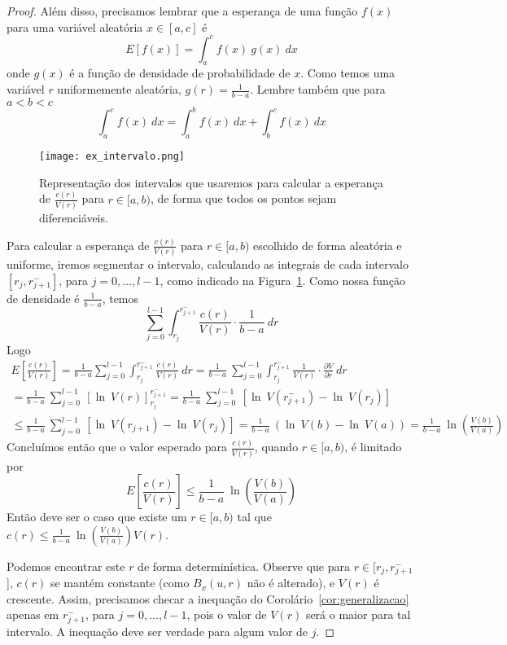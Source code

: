 \documentclass[12pt, a4paper]{article}
\begin{document}
\begin{proof}
Além disso, precisamos lembrar que a esperança de uma função $f(x)$ para uma variável aleatória $x \in [a, c]$ é
\[
    E[f(x)] = \int_a^c f(x)\ g(x)\ dx
\]
onde $g(x)$ é a função de densidade de probabilidade de $x$. Como temos uma variável $r$ uniformemente aleatória, $g(r) = \frac{1}{b - a}$.
Lembre também que para $a < b < c$
\[
    \int_a^c f(x)\ dx = \int_a^b f(x)\ dx + \int_b^c f(x)\ dx
\]

\begin{figure}[!htb]
\centering
\texttt{[image: ex\_intervalo.png]}
\caption{Representação dos intervalos que usaremos para calcular a esperança de $\frac{c(r)}{V(r)}$ para $r \in [a, b)$, de forma que todos os pontos sejam diferenciáveis.}
\label{fig:ex_intervalo}
\end{figure}

Para calcular a esperança de $\frac{c(r)}{V(r)}$ para $r \in [a, b)$ escolhido de forma aleatória e uniforme, iremos segmentar o intervalo, calculando as integrais de cada intervalo $[r_j, r_{j+1}^-]$, para $j = 0, \dots, l-1$, como indicado na Figura~\ref{fig:ex_intervalo}.
Como nossa função de densidade é $\frac{1}{b - a}$, temos
\[
    \sum_{j = 0}^{l-1} \int_{r_j}^{r_{j+1}^-} \frac{c(r)}{V(r)} \cdot \frac{1}{b-a}\ dr
\]
Logo
\begin{gather*}
    E\left[ \frac{c(r)}{V(r)} \right]
    = \frac{1}{b - a} \sum_{j = 0}^{l-1} \int_{r_j}^{r_{j+1}^-} \frac{c(r)}{V(r)}\ dr
    = \frac{1}{b - a}\ \sum_{j = 0}^{l-1} \int_{r_j}^{r_{j+1}^-} \frac{1}{V(r)} \cdot \frac{\partial V}{\partial r}\ dr\\
    = \frac{1}{b - a}\ \sum_{j = 0}^{l-1}\ [\ln\ V(r)]_{r_j}^{r_{j+1}^-}
    = \frac{1}{b - a}\ \sum_{j = 0}^{l-1}\ [\ln\ V(r_{j+1}^-) - \ln\ V(r_j)]\\
    \leq \frac{1}{b - a}\ \sum_{j = 0}^{l-1}\ [\ln\ V(r_{j+1}) - \ln\ V(r_j)]
    = \frac{1}{b - a}\ (\ln\ V(b) - \ln\ V(a))
    = \frac{1}{b - a}\ \ln\left(\frac{V(b)}{V(a)}\right)
\end{gather*}
Concluímos então que o valor esperado para $\frac{c(r)}{V(r)}$, quando $r \in [a, b)$, é limitado por 
\[
    E\left[ \frac{c(r)}{V(r)} \right] \leq \frac{1}{b - a}\ \ln\left(\frac{V(b)}{V(a)}\right)
\]
Então deve ser o caso que existe um $r \in [a, b)$ tal que $c(r) \leq \frac{1}{b - a}\ \ln\left(\frac{V(b)}{V(a)}\right)V(r)$.

Podemos encontrar este $r$ de forma determinística. Observe que para $r \in [r_j, r_{j+1}^-$], $c(r)$ se mantém constante (como $B_x(u, r)$ não é alterado), e $V(r)$ é crescente. Assim, precisamos checar a inequação do Corolário~\ref{cor:generalizacao} apenas em $r_{j+1}^-$, para $j=0, \dots, l-1$, pois o valor de $V(r)$ será o maior para tal intervalo. A inequação deve ser verdade para algum valor de $j$.
\end{proof}
\end{document}
